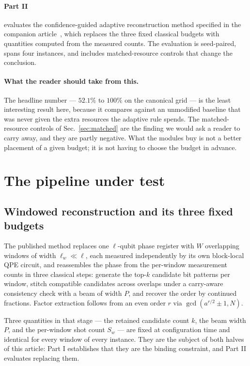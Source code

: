 \documentclass[preprint,11pt]{elsarticle}
\begin{document}
\paragraph{Part II} evaluates the confidence-guided adaptive reconstruction
method specified in the companion article~\cite{methodpaper}, which replaces
the three fixed classical budgets with quantities computed from the measured
counts. The evaluation is seed-paired, spans four instances, and includes
matched-resource controls that change the conclusion.

\paragraph{What the reader should take from this.} The headline number ---
$52.1\%$ to $100\%$ on the canonical grid --- is the least interesting result
here, because it compares against an unmodified baseline that was never given
the extra resources the adaptive rule spends. The matched-resource controls
of Sec.~\ref{sec:matched} are the finding we would ask a reader to carry
away, and they are partly negative. What the modules buy is not a better
placement of a given budget; it is not having to choose the budget in
advance.

\section{The pipeline under test}
\label{sec:pipeline}

\subsection{Windowed reconstruction and its three fixed budgets}

The published method \cite{wqpe2025,modularshor2025} replaces one
$\ell$-qubit phase register with $W$ overlapping windows of width
$\ell_w\ll\ell$, each measured independently by its own block-local QPE
circuit, and reassembles the phase from the per-window measurement counts in
three classical steps: generate the top-$k$ candidate bit patterns per
window, stitch compatible candidates across overlaps under a carry-aware
consistency check with a beam of width $P$, and recover the order by
continued fractions. Factor extraction follows from an even order $r$ via
$\gcd(a^{r/2}\pm1,N)$.

Three quantities in that stage --- the retained candidate count $k$, the beam
width $P$, and the per-window shot count $S_w$ --- are fixed at configuration
time and identical for every window of every instance. They are the subject
of both halves of this article: Part I establishes that they are the binding
constraint, and Part II evaluates replacing them.
\end{document}
